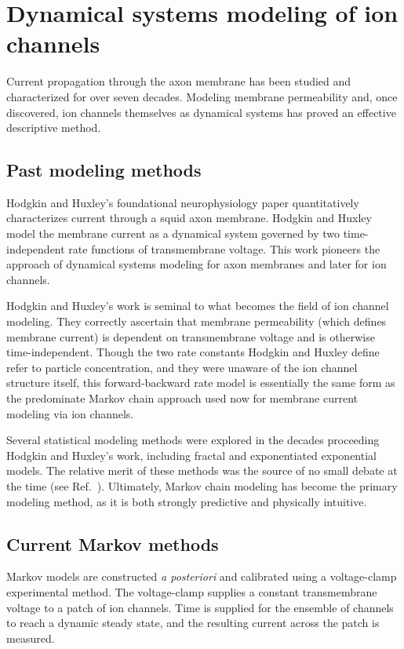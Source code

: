 \documentclass[%
 aip,
 amsmath,amssymb,
 reprint,%
]{revtex4-1}
\begin{document}
\section{Dynamical systems modeling of ion channels}
Current propagation through the axon membrane has been studied and characterized for over seven decades. Modeling membrane permeability and, once discovered, ion channels themselves as dynamical systems has proved an effective descriptive method.

\subsection{Past modeling methods}
Hodgkin and Huxley’s foundational neurophysiology paper quantitatively characterizes current through a squid axon membrane. Hodgkin and Huxley model the membrane current as a dynamical system governed by two time-independent rate functions of transmembrane voltage.\cite{HODG1952}
This work pioneers the approach of dynamical systems modeling for axon membranes and later for ion channels.

Hodgkin and Huxley's work is seminal to what becomes the field of ion channel modeling. They correctly ascertain that membrane permeability (which defines membrane current) is dependent on transmembrane voltage and is otherwise time-independent. Though the two rate constants Hodgkin and Huxley define refer to particle concentration, and they were unaware of the ion channel structure itself, this forward-backward rate model is essentially the same form as the predominate Markov chain approach used now for membrane current modeling via ion channels.

Several statistical modeling methods were explored in the decades proceeding Hodgkin and Huxley's work, including fractal\cite{LIEB1987} and exponentiated exponential models.\cite{EAST1978} The relative merit of these methods was the source of no small debate at the time (see Ref.~). Ultimately, Markov chain modeling has become the primary modeling method, as it is both strongly predictive and physically intuitive.

\subsection{Current Markov methods}
Markov models are constructed \textit{a posteriori} and calibrated using a voltage-clamp experimental method. The voltage-clamp supplies a constant transmembrane voltage to a patch of ion channels. Time is supplied for the ensemble of channels to reach a dynamic steady state, and the resulting current across the patch is measured.
\end{document}
